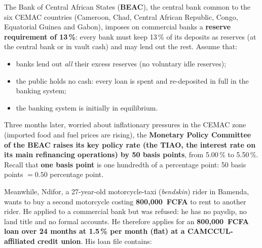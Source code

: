 \documentclass[11pt]{article}
\begin{document}
The Bank of Central African States (\textbf{BEAC}), the central bank common to the six CEMAC countries (Cameroon, Chad, Central African Republic, Congo, Equatorial Guinea and Gabon), imposes on commercial banks a \textbf{reserve requirement of 13\,\%}: every bank must keep 13\,\% of its deposits as reserves (at the central bank or in vault cash) and may lend out the rest. Assume that:

\begin{itemize}
\item banks lend out \emph{all} their excess reserves (no voluntary idle reserves);
\item the public holds no cash: every loan is spent and re-deposited in full in the banking system;
\item the banking system is initially in equilibrium.
\end{itemize}

Three months later, worried about inflationary pressures in the CEMAC zone (imported food and fuel prices are rising), the \textbf{Monetary Policy Committee of the BEAC raises its key policy rate (the TIAO, the interest rate on its main refinancing operations) by 50 basis points}, from 5.00\,\% to 5.50\,\%. Recall that \textbf{one basis point} is one hundredth of a percentage point: 50 basis points $= 0.50$ percentage point.

Meanwhile, Ndifor, a 27-year-old motorcycle-taxi (\emph{bendskin}) rider in Bamenda, wants to buy a second motorcycle costing \textbf{800,000~FCFA} to rent to another rider. He applied to a commercial bank but was refused: he has no payslip, no land title and no formal accounts. He therefore applies for an \textbf{800,000~FCFA loan over 24 months at 1.5\,\% per month (flat) at a CAMCCUL-affiliated credit union}. His loan file contains:
\end{document}
